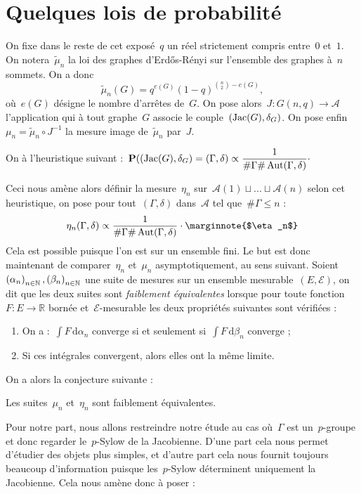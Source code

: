 \section{Quelques lois de probabilité}
	On fixe dans le reste de cet exposé~$q$ un réel strictement compris entre~$0$ et~$1$. On notera~$\tilde{\mu}_n$ la loi des graphes d'Erd\H{o}s-Rényi sur l'ensemble des graphes à~$n$ sommets. On a donc
	\[
		\tilde{\mu}_n(G) = q^{e(G)}(1-q)^{\binom{n}{2}-e(G)},
	\]
	où~$e(G)$ désigne le nombre d'arrêtes de~$G$. On pose alors~$J:G(n,q)\rightarrow \mathscr{A}$ l'application qui à tout graphe~$G$ associe le couple~$(\operatorname{Jac}(G),\delta_G)$. On pose enfin~$\mu_n = \tilde{\mu}_n \circ J^{-1}$ la mesure image de~$\tilde{\mu}_n$ par~$J$.
	\begin{heur}
		On à l'heuristique suivant :~$\displaystyle\bm{\mathrm{P}}((\operatorname{Jac}(G),\delta_G)=(\Gamma,\delta) \propto \frac{1}{\#\Gamma\#\operatorname{Aut}(\Gamma,\delta)}\cdot$
	\end{heur}
	Ceci nous amène alors définir la mesure~$\eta_n$ sur~$\mathscr{A}(1)\sqcup ...\sqcup \mathscr{A}(n)$ selon cet heuristique, on pose pour tout~$(\Gamma,\delta)$ dans~$\mathscr{A}$ tel que~$\#\Gamma \leq n$ :
	\[
		\eta_n(\Gamma,\delta) \propto\frac{1}{\#\Gamma\#\Aut(\Gamma,\delta)}\cdot
		\text{\marginnote{$\eta_n$}}
	\]
	Cela est possible puisque l'on est sur un ensemble fini. Le but est donc maintenant de comparer~$\eta_n$ et~$\mu_n$ asymptotiquement, au sens suivant. Soient~$\suite{\alpha},\suite{\beta}$ une suite de mesures sur un ensemble mesurable~$(E,\mathcal{E})$, on dit que les deux suites sont \emph{faiblement équivalentes} lorsque pour toute fonction~$F : E\rightarrow\mathbb{R}$ bornée et~$\mathcal{E}$-mesurable les deux propriétés suivantes sont vérifiées :
	\begin{enumerate}
		\item On a :~$\int F\,\mathrm{d}\alpha_n$ converge si et seulement si~$\int F\,\mathrm{d}\beta_n$ converge ;
		\item Si ces intégrales convergent, alors elles ont la même limite.
	\end{enumerate}
	 On a alors la conjecture suivante :
	\begin{conj}
		Les suites~$\mu_n$ et~$\eta_n$ sont faiblement équivalentes.
	\end{conj}
	Pour notre part, nous allons restreindre notre étude au cas où~$\Gamma$ est un~$p$-groupe et donc regarder le~$p$-Sylow de la Jacobienne. D'une part cela nous permet d'étudier des objets plus simples, et d'autre part cela nous fournit toujours beaucoup d'information puisque les~$p$-Sylow déterminent uniquement la Jacobienne. Cela nous amène donc à poser :
